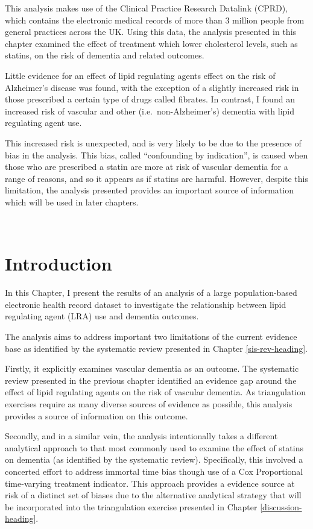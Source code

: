 \documentclass[a4paper, twoside]{templates/ociamthesis}
\begin{document}
This analysis makes use of the Clinical Practice Research Datalink (CPRD), which contains the electronic medical records of more than 3 million people from general practices across the UK. Using this data, the analysis presented in this chapter examined the effect of treatment which lower cholesterol levels, such as statins, on the risk of dementia and related outcomes.

Little evidence for an effect of lipid regulating agents effect on the risk of Alzheimer's disease was found, with the exception of a slightly increased risk in those prescribed a certain type of drugs called fibrates. In contrast, I found an increased risk of vascular and other (i.e.~non-Alzheimer's) dementia with lipid regulating agent use.

This increased risk is unexpected, and is very likely to be due to the presence of bias in the analysis. This bias, called ``confounding by indication'', is caused when those who are prescribed a statin are more at risk of vascular dementia for a range of reasons, and so it appears as if statins are harmful. However, despite this limitation, the analysis presented provides an important source of information which will be used in later chapters.

~

\hypertarget{introduction-1}{%
\section{Introduction}\label{introduction-1}}

In this Chapter, I present the results of an analysis of a large population-based electronic health record dataset to investigate the relationship between lipid regulating agent (LRA) use and dementia outcomes.

The analysis aims to address important two limitations of the current evidence base as identified by the systematic review presented in Chapter \ref{sis-rev-heading}.

Firstly, it explicitly examines vascular dementia as an outcome. The systematic review presented in the previous chapter identified an evidence gap around the effect of lipid regulating agents on the risk of vascular dementia. As triangulation exercises require as many diverse sources of evidence as possible, this analysis provides a source of information on this outcome.

Secondly, and in a similar vein, the analysis intentionally takes a different analytical approach to that most commonly used to examine the effect of statins on dementia (as identified by the systematic review). Specifically, this involved a concerted effort to address immortal time bias though use of a Cox Proportional time-varying treatment indicator. This approach provides a evidence source at risk of a distinct set of biases due to the alternative analytical strategy that will be incorporated into the triangulation exercise presented in Chapter \ref{discussion-heading}.
\end{document}
